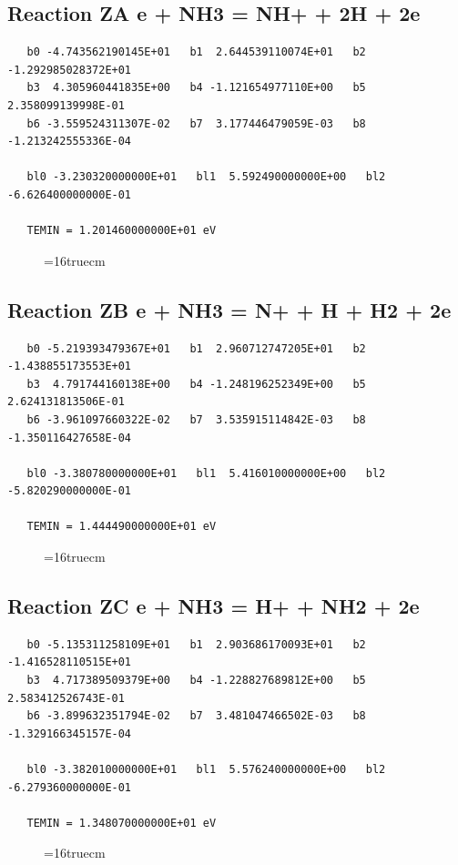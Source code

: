 \documentclass[12pt,dvipdfm]{article}
\begin{document}
\subsection{
Reaction ZA e + NH3 = NH+ + 2H + 2e }
\begin{small}\begin{verbatim}
   b0 -4.743562190145E+01   b1  2.644539110074E+01   b2 -1.292985028372E+01
   b3  4.305960441835E+00   b4 -1.121654977110E+00   b5  2.358099139998E-01
   b6 -3.559524311307E-02   b7  3.177446479059E-03   b8 -1.213242555336E-04

   bl0 -3.230320000000E+01   bl1  5.592490000000E+00   bl2 -6.626400000000E-01

   TEMIN = 1.201460000000E+01 eV
\end{verbatim}\end{small}
\begin{figure}[h!] \label{n2rates}
\epsfxsize=16truecm
\end{figure}
\newpage

\subsection{
Reaction ZB e + NH3 = N+ + H + H2 + 2e }
\begin{small}\begin{verbatim}
   b0 -5.219393479367E+01   b1  2.960712747205E+01   b2 -1.438855173553E+01
   b3  4.791744160138E+00   b4 -1.248196252349E+00   b5  2.624131813506E-01
   b6 -3.961097660322E-02   b7  3.535915114842E-03   b8 -1.350116427658E-04

   bl0 -3.380780000000E+01   bl1  5.416010000000E+00   bl2 -5.820290000000E-01

   TEMIN = 1.444490000000E+01 eV
\end{verbatim}\end{small}
\begin{figure}[h!] \label{n2rates}
\epsfxsize=16truecm
\end{figure}
\newpage

\subsection{
Reaction ZC e + NH3 = H+ + NH2 + 2e }
\begin{small}\begin{verbatim}
   b0 -5.135311258109E+01   b1  2.903686170093E+01   b2 -1.416528110515E+01
   b3  4.717389509379E+00   b4 -1.228827689812E+00   b5  2.583412526743E-01
   b6 -3.899632351794E-02   b7  3.481047466502E-03   b8 -1.329166345157E-04

   bl0 -3.382010000000E+01   bl1  5.576240000000E+00   bl2 -6.279360000000E-01

   TEMIN = 1.348070000000E+01 eV
\end{verbatim}\end{small}
\begin{figure}[h!] \label{n2rates}
\epsfxsize=16truecm
\end{figure}
\newpage
\end{document}
